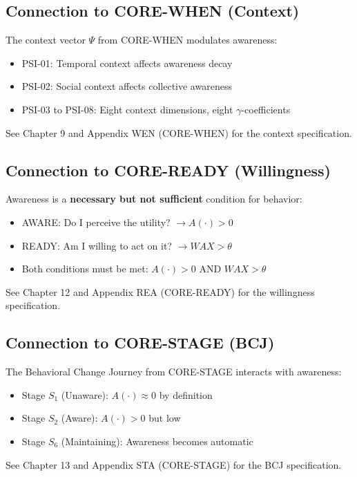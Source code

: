 \subsection{Connection to CORE-WHEN (Context)}

\begin{cross-reference}
The context vector $\Psi$ from CORE-WHEN modulates awareness:
\begin{itemize}[nosep]
  \item PSI-01: Temporal context affects awareness decay
  \item PSI-02: Social context affects collective awareness
  \item PSI-03 to PSI-08: Eight context dimensions, eight $\gamma$-coefficients
\end{itemize}
See Chapter 9 and Appendix WEN (CORE-WHEN) for the context specification.
\end{cross-reference}

\subsection{Connection to CORE-READY (Willingness)}

\begin{cross-reference}
Awareness is a \textbf{necessary but not sufficient} condition for behavior:
\begin{itemize}[nosep]
  \item AWARE: Do I perceive the utility? $\rightarrow A(\cdot) > 0$
  \item READY: Am I willing to act on it? $\rightarrow WAX > \theta$
  \item Both conditions must be met: $A(\cdot) > 0$ AND $WAX > \theta$
\end{itemize}
See Chapter 12 and Appendix REA (CORE-READY) for the willingness specification.
\end{cross-reference}

\subsection{Connection to CORE-STAGE (BCJ)}

\begin{cross-reference}
The Behavioral Change Journey from CORE-STAGE interacts with awareness:
\begin{itemize}[nosep]
  \item Stage $S_1$ (Unaware): $A(\cdot) \approx 0$ by definition
  \item Stage $S_2$ (Aware): $A(\cdot) > 0$ but low
  \item Stage $S_6$ (Maintaining): Awareness becomes automatic
\end{itemize}
See Chapter 13 and Appendix STA (CORE-STAGE) for the BCJ specification.
\end{cross-reference}

